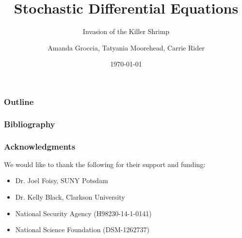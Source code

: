 \documentclass{beamer} %
\begin{document}
\author{Amanda Groccia, Tatyania Moorehead, Carrie Rider}



\title{Stochastic Differential Equations}
\subtitle{Invasion of the Killer Shrimp}
\date{\today}

\begin{frame}
  \titlepage
\end{frame}


\begin{frame}
  \frametitle{Outline}
  \tableofcontents[hideallsubsections]
\end{frame}












\begin{frame}
  \frametitle{Bibliography}

  
  
  
\end{frame}


\begin{frame}
  \frametitle{Acknowledgments}
  
  We would like to thank the following for their support and funding: 
  
 \begin{itemize}
 \item Dr. Joel Foisy, SUNY Potsdam
 \item Dr. Kelly Black, Clarkson University
 \item National Security Agency (H98230-14-1-0141)
 \item National Science Foundation (DSM-1262737)
 \end{itemize}
\end{frame}
\end{document}
